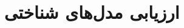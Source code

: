 \documentclass[11pt,a4paper,openany]{book}
\begin{document}
\frontmatter\tableofcontents
\mainmatter
\chapter{ارزیابی مدل‌های شناختی}
\end{document}
